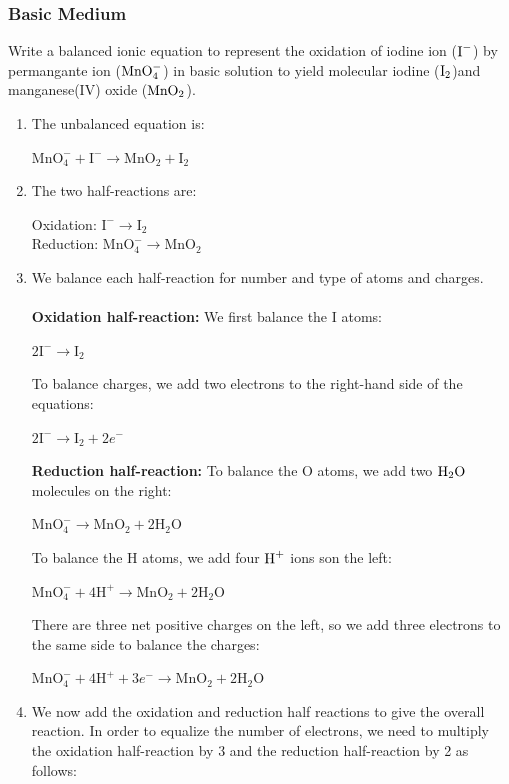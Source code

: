\documentclass[a4paper,12pt,twocolumn]{article}
\begin{document}
\subsubsection{Basic Medium}
{\large Write a balanced ionic equation to represent the oxidation of iodine ion ($\ce{I^-}$) by permangante ion ($\ce{MnO^{-}4}$) in basic solution to yield molecular iodine ($\ce{I2}$)and manganese(IV) oxide ($\ce{MnO2}$)}.
\begin{enumerate}
\item The unbalanced equation is:
\begin{center}
$\mathrm{MnO}_{4}^{-}+\mathrm{I}^{-} \longrightarrow \mathrm{MnO}_{2}+\mathrm{I}_{2}$
\end{center}
\item The two half-reactions are:
\begin{center}
Oxidation: $\mathrm{I}^{-} \longrightarrow \mathrm{I}_{2}$\\
Reduction: $\mathrm{MnO}_{4}^{-} \longrightarrow \mathrm{MnO}_{2}$
\end{center}
\item We balance each half-reaction for number and type of atoms and charges.\\
\\
\textbf{Oxidation half-reaction:} We first balance the I atoms:
\begin{center}
$2 \mathrm{I}^{-} \longrightarrow \mathrm{I}_{2}$
\end{center}
To balance charges, we add two electrons to the right-hand side of the equations:
\begin{center}
$2 \mathrm{I}^{-} \longrightarrow \mathrm{I}_{2}+2 e^{-}$
\end{center}
\textbf{Reduction half-reaction:} To balance the O atoms, we add two $\ce{H2O}$ molecules on the right:
\begin{center}
$\mathrm{MnO}_{4}^{-} \longrightarrow \mathrm{MnO}_{2}+2 \mathrm{H}_{2} \mathrm{O}$
\end{center}
To balance the H atoms, we add four $\ce{H^+}$ ions son the left: 
\begin{center}
$\mathrm{MnO}_{4}^{-}+4 \mathrm{H}^{+} \longrightarrow \mathrm{MnO}_{2}+2 \mathrm{H}_{2} \mathrm{O}$
\end{center}
There are three net positive charges on the left, so we add three electrons to the same side to balance the charges:
\begin{center}
$\mathrm{MnO}_{4}^{-}+4 \mathrm{H}^{+}+3 e^{-} \longrightarrow \mathrm{MnO}_{2}+2 \mathrm{H}_{2} \mathrm{O}$
\end{center}
\item We now add the oxidation and reduction half reactions to give the overall reaction. In order to equalize the number of electrons, we need to multiply the oxidation half-reaction by 3 and the reduction half-reaction by 2 as follows: \\


\end{enumerate}
\end{document}

